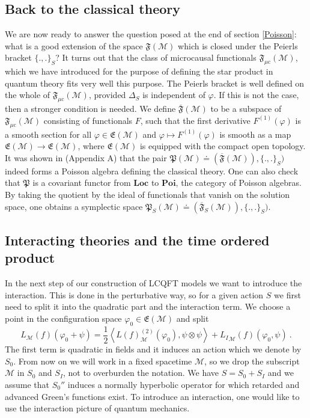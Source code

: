 \documentclass[11pt]{article}
\newcommand{\E}{\mathfrak{E}}
\newcommand{\fP}{\mathfrak{P}}
\newcommand{\F}{\mathfrak{F}}
\newcommand{\Mcal}{\mathcal{M}}
\newcommand{\Po}{\mathrm{\mathbf{Poi}}}
\newcommand{\Loc}{\mathrm{\mathbf{Loc}}}       %
\newcommand{\WF}{\mathrm{WF}}         %
\newcommand{\mc}{{\mu\mathrm{c}}}
\newcommand{\ph}{\varphi}
\newcommand{\Poi}[2]{\{#1,#2\}}
\newcommand{\1}{\mathds{1}}                         %
\newcommand{\be}{\begin{equation}}
\newcommand{\ee}{\end{equation}}
\begin{document}
{{\subsection{Back to the classical theory}\label{backtoclass}
We are now ready to answer the question posed at the end of section \ref{Poisson}: what is a good extension of the space $\F(\Mcal)$ which is closed under the Peierls bracket $\Poi{.}{.}_S$? It turns out that the class of microcausal functionals $\F_\mc(\Mcal)$, which we have introduced for the purpose of defining the star product in quantum theory fits very well this purpose. The Peierls bracket is well defined on the whole of $\F_\mc(\Mcal)$, provided $\Delta_S$ is independent of $\ph$. If this is not the case, then a stronger condition is needed. We define $\overline{\F}(\Mcal)$ to be a subspace of $\F_{\mc}(\Mcal)$  consisting of functionals $F$, such that the first derivative $F^{(1)}(\ph)$ is a smooth section for all $\ph\in\E(\Mcal)$ and 
$\ph\mapsto F^{(1)}(\ph)$ is smooth as a map $\E(\Mcal)\rightarrow \E(\Mcal)$, where $\E(\Mcal)$ is equipped with the compact open topology. It was shown in \cite{BFRej13} (Appendix A) that the pair $\fP(\Mcal)\doteq(\overline{\F}(\Mcal)),\{.,.\}_S)$ indeed forms a Poisson algebra defining the classical theory.
One can also check that $\fP$ is a covariant functor from $\Loc$ to $\Po$, the category of Poisson algebras. By taking the quotient by the ideal of functionals that vanish on the solution space, one obtains a symplectic space $\fP_S(\Mcal)\doteq(\overline{\F}_S(\Mcal)),\{.,.\}_S)$.
\subsection{Interacting theories and the time ordered product}
In the next step of our construction of LCQFT models we want to introduce the interaction. This is done in the perturbative way, so for a given action $S$ we first need to split it into the quadratic part and the interaction term. We choose a point in the configuration space $\ph_0\in\E(\Mcal)$ and split
\be
L_\Mcal(f)(\ph_0+\psi)=\frac12 \left< L(f)^{(2)}_\Mcal(\ph_0),\psi\otimes\psi\right>+{L_I}_\Mcal(f)(\ph_0,\psi) \ .
\ee
The first term is quadratic in fields and it induces an action which we denote by $S_0$. From now on we will work in a fixed spacetime $\Mcal$, so we drop the subscript $\Mcal$ in $S_0$ and $S_I$, not to overburden the notation. We have $S=S_0+S_I$ and we assume that $S_0''$ induces a normally hyperbolic operator for which retarded and advanced Green's functions exist. To introduce an interaction, one would like to use the interaction picture of quantum mechanics. 

}}
\end{document}

